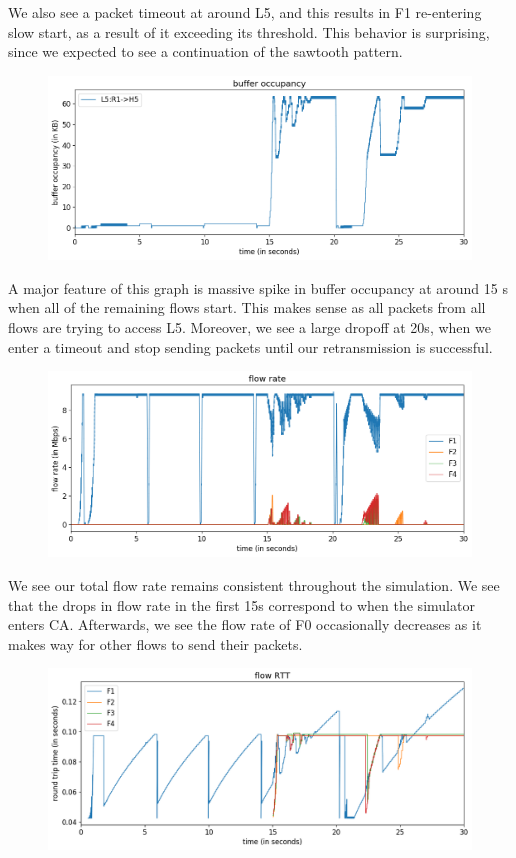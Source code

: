\documentclass{article}
\begin{document}
We also see a packet timeout at around L5, and this results in F1 re-entering slow start, as a result of it exceeding its threshold. This behavior is surprising, since we expected to see a continuation of the sawtooth pattern. 

\begin{figure}[H]
\centering
\includegraphics[width = \textwidth]{"test_case5_reno buffer occupancy"}
\end{figure}

A major feature of this graph is massive spike in buffer occupancy at around 15 s when all of the remaining flows start. This makes sense as all packets from all flows are trying to access L5. Moreover, we see a large dropoff at 20s, when we enter a timeout and stop sending packets until our retransmission is successful. 

\begin{figure}[H]
\centering
\includegraphics[width = \textwidth]{"test_case5_reno flow rate"}
\end{figure}

We see our total flow rate remains consistent throughout the simulation. We see that the drops in flow rate in the first 15s correspond to when the simulator enters CA. Afterwards, we see the flow rate of F0 occasionally decreases as it makes way for other flows to send their packets.

\begin{figure}[H]
\centering
\includegraphics[width = \textwidth]{"test_case5_reno flow RTT"}
\end{figure}
\end{document}
